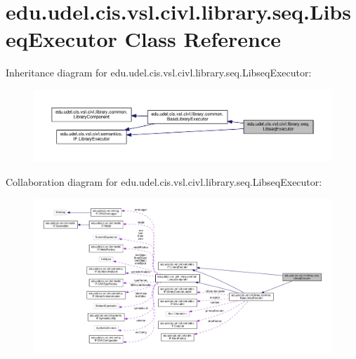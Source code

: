 \hypertarget{classedu_1_1udel_1_1cis_1_1vsl_1_1civl_1_1library_1_1seq_1_1LibseqExecutor}{}\section{edu.\+udel.\+cis.\+vsl.\+civl.\+library.\+seq.\+Libseq\+Executor Class Reference}
\label{classedu_1_1udel_1_1cis_1_1vsl_1_1civl_1_1library_1_1seq_1_1LibseqExecutor}


Inheritance diagram for edu.\+udel.\+cis.\+vsl.\+civl.\+library.\+seq.\+Libseq\+Executor\+:
\nopagebreak
\begin{figure}[H]
\begin{center}
\leavevmode
\includegraphics[width=350pt]{classedu_1_1udel_1_1cis_1_1vsl_1_1civl_1_1library_1_1seq_1_1LibseqExecutor__inherit__graph}
\end{center}
\end{figure}


Collaboration diagram for edu.\+udel.\+cis.\+vsl.\+civl.\+library.\+seq.\+Libseq\+Executor\+:
\nopagebreak
\begin{figure}[H]
\begin{center}
\leavevmode
\includegraphics[width=350pt]{classedu_1_1udel_1_1cis_1_1vsl_1_1civl_1_1library_1_1seq_1_1LibseqExecutor__coll__graph}
\end{center}
\end{figure}
